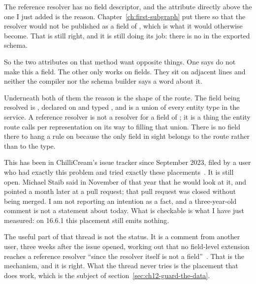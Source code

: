 %
The reference resolver has no field descriptor, and the attribute directly
above the one I just added is the reason.
Chapter~\ref{ch:first-subgraph} put \code{[GraphQLIgnore]} there so that the
resolver would not be published as a field of , which is what
it would otherwise become. That is still right, and it is still doing its
job: there is no  in the exported schema.

%
So the two attributes on that method want opposite things. One says do not
make this a field. The other only works on fields. They sit on adjacent lines
and neither the compiler nor the schema builder says a word about it.

%
Underneath both of them the reason is the shape of the route. The field being
resolved is , declared on  and typed
\code{[\_Entity]!}, and  is a union of every entity type in
the service. A reference resolver is not a resolver for a field of
; it is a thing the entity route calls per representation on
its way to filling that union. There is no field there to hang a rule on
because the only field in sight belongs to the route rather than to the type.

%
This has been in ChilliCream's issue tracker since September 2023, filed by a
user who had exactly this problem and tried exactly these
placements~\autocite{chillicream6546}. It is still open. Michael Staib said
in November of that year that he would look at it, and pointed a month later
at a pull request; that pull request was closed without being merged. I am
not reporting an intention as a fact, and a three-year-old comment is not a
statement about today. What is checkable is what I have just measured: on
16.6.1 this placement still emits nothing.

%
The useful part of that thread is not the status. It is a comment from
another user, three weeks after the issue opened, working out that no
field-level extension reaches a reference resolver \enquote{since the
resolver itself is not a field}~\autocite{chillicream6546}. That is the
mechanism, and it is right. What the thread never tries is the placement that
does work, which is the subject of section~\ref{sec:ch12-guard-the-data}.
%
